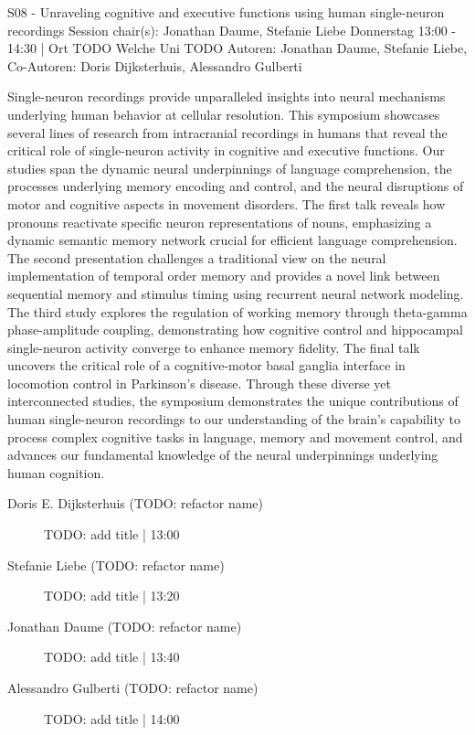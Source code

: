 
            \begin{symposium}
            {S08 - Unraveling cognitive and executive functions using human single-neuron recordings}
            {Session chair(s): Jonathan Daume, Stefanie Liebe}
            {Donnerstag 13:00 - 14:30 | Ort TODO}
            {Welche Uni TODO}
            Autoren: Jonathan Daume, Stefanie Liebe, Co-Autoren: Doris Dijksterhuis, Alessandro Gulberti

Single-neuron recordings provide unparalleled insights into neural mechanisms underlying human behavior at cellular resolution. This symposium showcases several lines of research from intracranial recordings in humans that reveal the critical role of single-neuron activity in cognitive and executive functions. Our studies span the dynamic neural underpinnings of language comprehension, the processes underlying memory encoding and control, and the neural disruptions of motor and cognitive aspects in movement disorders. The first talk reveals how pronouns reactivate specific neuron representations of nouns, emphasizing a dynamic semantic memory network crucial for efficient language comprehension. The second presentation challenges a traditional view on the neural implementation of temporal order memory and provides a novel link between sequential memory and stimulus timing using recurrent neural network modeling. The third study explores the regulation of working memory through theta-gamma phase-amplitude coupling, demonstrating how cognitive control and hippocampal single-neuron activity converge to enhance memory fidelity. The final talk uncovers the critical role of a cognitive-motor basal ganglia interface in locomotion control in Parkinson's disease. Through these diverse yet interconnected studies, the symposium demonstrates the unique contributions of human single-neuron recordings to our understanding of the brain's capability to process complex cognitive tasks in language, memory and movement control, and advances our fundamental knowledge of the neural underpinnings underlying human cognition.
            \begin{description}    
            
                \item [Doris E. Dijksterhuis (TODO: refactor name)] TODO: add title \textcolor{mygray}{ | 13:00}    
                
                \item [Stefanie Liebe (TODO: refactor name)] TODO: add title \textcolor{mygray}{ | 13:20}    
                
                \item [Jonathan Daume (TODO: refactor name)] TODO: add title \textcolor{mygray}{ | 13:40}    
                
                \item [Alessandro Gulberti (TODO: refactor name)] TODO: add title \textcolor{mygray}{ | 14:00}    
                
            \end{description} 
            \end{symposium}
            
